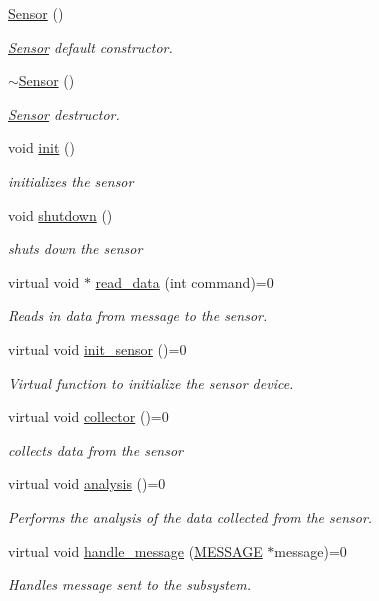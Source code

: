 \begin{DoxyCompactItemize}
\item 
\hyperlink{classSensor_a342d6d11ef572c8cba92cb76fb1a294b}{Sensor} ()
\begin{DoxyCompactList}\small\item\em \hyperlink{classSensor}{Sensor} default constructor. \end{DoxyCompactList}\item 
\hyperlink{classSensor_aee8c70e7ef05ce65e7ee33686b5d7db2}{$\sim$\-Sensor} ()
\begin{DoxyCompactList}\small\item\em \hyperlink{classSensor}{Sensor} destructor. \end{DoxyCompactList}\item 
void \hyperlink{classSensor_a84bc35cfba92eb579bc311b3c8b2980d}{init} ()
\begin{DoxyCompactList}\small\item\em initializes the sensor \end{DoxyCompactList}\item 
void \hyperlink{classSensor_a2f08975182e98e644efb226435124047}{shutdown} ()
\begin{DoxyCompactList}\small\item\em shuts down the sensor \end{DoxyCompactList}\item 
virtual void $\ast$ \hyperlink{classSensor_acf4ff5c6c8f793ed47a8105b94ff7c3e}{read\-\_\-data} (int command)=0
\begin{DoxyCompactList}\small\item\em Reads in data from message to the sensor. \end{DoxyCompactList}\item 
virtual void \hyperlink{classSensor_a11b28f6bc91d6f69e734e13ab0e64f56}{init\-\_\-sensor} ()=0
\begin{DoxyCompactList}\small\item\em Virtual function to initialize the sensor device. \end{DoxyCompactList}\item 
virtual void \hyperlink{classSensor_ae4ec41b880d44feb898da5c62c3203c9}{collector} ()=0
\begin{DoxyCompactList}\small\item\em collects data from the sensor \end{DoxyCompactList}\item 
virtual void \hyperlink{classSensor_a595d8d9cd87dd3704fad2a313c709a7e}{analysis} ()=0
\begin{DoxyCompactList}\small\item\em Performs the analysis of the data collected from the sensor. \end{DoxyCompactList}\item 
virtual void \hyperlink{classSensor_a45533b253f81f85d1b6fcea902a5692b}{handle\-\_\-message} (\hyperlink{SUBSYS__COMMANDS_8h_ad814416fc1a8c675bea2687d96088a8f}{M\-E\-S\-S\-A\-G\-E} $\ast$message)=0
\begin{DoxyCompactList}\small\item\em Handles message sent to the subsystem. \end{DoxyCompactList}\end{DoxyCompactItemize}
